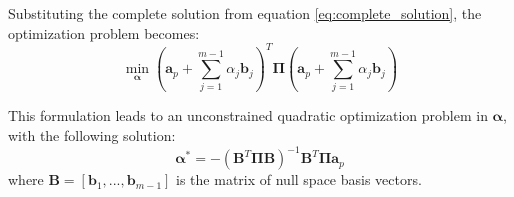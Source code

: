 Substituting the complete solution from equation \eqref{eq:complete_solution}, the optimization problem becomes:
\begin{equation}
\min_{\boldsymbol{\alpha}} \left(\mathbf{a}_p + \sum_{j=1}^{m-1} \alpha_j \mathbf{b}_j\right)^T \boldsymbol{\Pi} \left(\mathbf{a}_p + \sum_{j=1}^{m-1} \alpha_j \mathbf{b}_j\right)
\label{eq:optimization}
\end{equation}

This formulation leads to an unconstrained quadratic optimization problem in $\boldsymbol{\alpha}$, with the following solution:
\begin{equation}
\boldsymbol{\alpha}^* = -(\mathbf{B}^T \boldsymbol{\Pi} \mathbf{B})^{-1} \mathbf{B}^T \boldsymbol{\Pi} \mathbf{a}_p
\end{equation}
where $\mathbf{B} = [\mathbf{b}_1, ..., \mathbf{b}_{m-1}]$ is the matrix of null space basis vectors.









